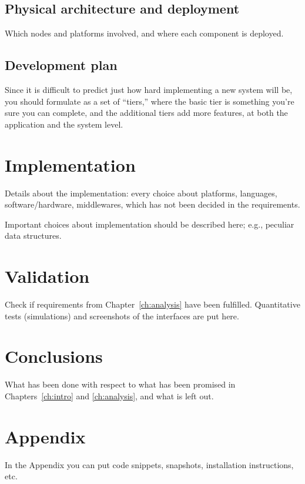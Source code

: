 \documentclass{memoir}
\begin{document}
\section{Physical architecture and deployment}
Which nodes and platforms involved, and where each component is deployed.

\section{Development plan}
Since it is difficult to predict just how hard implementing a new system will be, you should formulate as a set of ``tiers,'' where the basic tier is something you’re sure you can complete, and the additional tiers add more features, at both the application and the system level.

\chapter{Implementation}

Details about the implementation: every choice about platforms, languages, software/hardware, middlewares, which has not been decided in the requirements.


Important choices about implementation should be described here; e.g., peculiar data structures.


\chapter{Validation}

Check if requirements from Chapter~\ref{ch:analysis} have been fulfilled.
Quantitative tests (simulations) and screenshots of the interfaces are put here.


\chapter{Conclusions}

What has been done with respect to what has been promised in Chapters~\ref{ch:intro} and \ref{ch:analysis}, and what is left out.

\appendix

\chapter{Appendix}

In the Appendix you can put code snippets, snapshots, installation instructions, etc.
\end{document}
